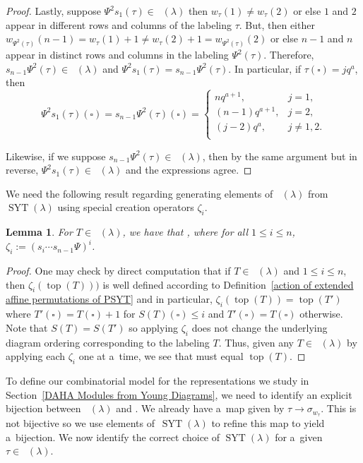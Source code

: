 \documentclass[10pt,a4paper]{amsart}
\numberwithin{equation}{section}
\newtheorem{Lemma}[Theorem]{Lemma}
\theoremstyle{definition}
\DeclareMathOperator{\RYT}{\mathrm{RYT}_{\geq 0}}
\DeclareMathOperator{\SYT}{\mathrm{SYT}}
\DeclareMathOperator{\PSYT}{\mathrm{PSYT}_{\geq 0}}
\DeclareMathOperator{\Top}{\mathrm{top}}
\begin{document}
\begin{proof}
Lastly, suppose $\Psi^{2}s_1(\tau) \in \PSYT(\lambda)$ then $w_{\tau}(1) \neq w_{\tau}(2)$ or else $1$ and $2$ appear in different rows and columns of the labeling $\tau$. But, then either $w_{\Psi^2(\tau)}(n-1) = w_{\tau}(1)+1 \neq w_{\tau}(2) +1= w_{\Psi^2(\tau)}(2)$ or else $n-1$ and $n$ appear in distinct rows and columns in the labeling $\Psi^2(\tau)$. Therefore, $s_{n-1}\Psi^2(\tau) \in \PSYT(\lambda)$ and $\Psi^{2}s_1(\tau)=s_{n-1}\Psi^2(\tau)$. In particular, if $\tau(\square) = jq^a$, then
\[
 \Psi^{2}s_1(\tau)(\square) = s_{n-1}\Psi^2(\tau)(\square) = \begin{cases}
 nq^{a+1}, & j =1 ,\\
 (n-1)q^{a+1} ,& j =2 ,\\
 (j-2)q^a ,& j\neq 1,2 .\\
\end{cases}
\]

Likewise, if we suppose $s_{n-1}\Psi^2(\tau) \in \PSYT(\lambda)$, then by the same argument but in reverse, $\Psi^{2}s_1(\tau) \in \PSYT(\lambda)$ and the expressions agree.
\end{proof}

We need the following result regarding generating elements of $\PSYT(\lambda)$ from $\SYT(\lambda)$ using special creation operators $\zeta_i$.

\begin{Lemma}\label{creation operator Lemma}
 For $T \in \RYT(\lambda)$, we have that
 \smash{$\Top(T) = \zeta_1^{\nu(T)_1 - \nu(T)_2}\cdots \zeta_n^{\nu(T)_{n}}(S(T))$}, where for all $1\leq i \leq n$,
 $\zeta_i:= (s_i\cdots s_{n-1}\Psi)^{i}$.
\end{Lemma}

\begin{proof}
 One may check by direct computation that if $T \in \RYT(\lambda)$ and $1\leq i \leq n$, then $\zeta_i(\Top(T)))$ is well defined according to Definition~\ref{action of extended affine permutations of PSYT} and in particular,
 $\zeta_i(\Top(T)) = \Top(T')$ where $T'(\square) = T(\square) + 1$ for $S(T)(\square) \leq i$ and $T'(\square) = T(\square)$ otherwise. Note that $S(T)= S(T')$ so applying $\zeta_i$ does not change the underlying diagram ordering corresponding to the labeling $T$. Thus, given any $T \in \RYT(\lambda)$ by applying each $\zeta_i$ one at a~time, we see that  must equal $\Top(T)$.
\end{proof}

To define our combinatorial model for the representations we study in Section~\ref{DAHA Modules from Young Diagrams}, we need to identify an explicit bijection between $\PSYT(\lambda)$ and \smash{$\bigl(\widehat{\mathfrak{S}}_n/\mathfrak{S}_n \bigr)^{+} \times \SYT(\lambda)$}. We already have a~map \smash{$\PSYT(\lambda) \rightarrow \bigl(\widehat{\mathfrak{S}}_n/\mathfrak{S}_n \bigr)^{+}$} given by $\tau \rightarrow \sigma_{w_{\tau}}$. This is not bijective so we use elements of~$\SYT(\lambda)$ to refine this map to yield a~bijection. We now identify the correct choice of $\SYT(\lambda)$ for a~given $\tau \in \PSYT(\lambda)$.
\end{document}
